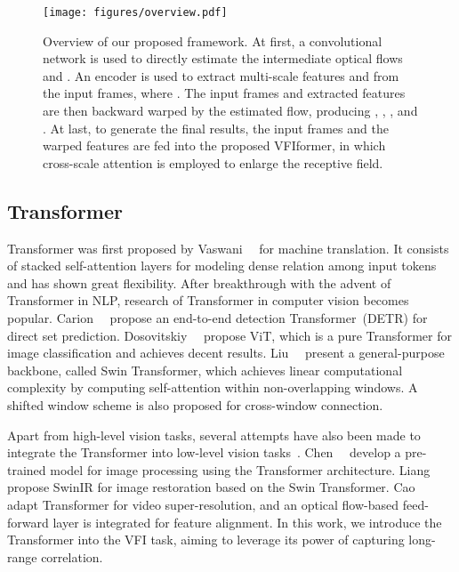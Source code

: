 \documentclass[10pt,twocolumn,letterpaper]{article}
\begin{document}
	\begin{figure*}[t]
		\begin{center}
			\texttt{[image: figures/overview.pdf]}
		\end{center}
\caption{Overview of our proposed framework. At first, a convolutional network is used to directly estimate the intermediate optical flows  and . An encoder  is used to extract multi-scale features  and  from the input frames, where . The input frames and extracted features are then backward warped by the estimated flow, producing , , , and . At last, to generate the final results, the input frames and the warped features are fed into the proposed VFIformer, in which cross-scale attention is employed to enlarge the receptive field.}
		\label{fig:overview}
	\end{figure*}
	
	
	\subsection{Transformer}
	
	Transformer was first proposed by Vaswani~\etal~\cite{vaswani2017attention} for machine translation. It consists of stacked self-attention layers for modeling dense relation among input tokens and has shown great flexibility. After breakthrough with the advent of Transformer in NLP, research of Transformer in computer vision becomes popular. Carion~\etal~\cite{carion2020end} propose an end-to-end detection Transformer~(DETR) for direct set prediction. Dosovitskiy~\etal~\cite{dosovitskiy2020image} propose ViT, which is a pure Transformer for image classification and achieves decent results. Liu~\etal~\cite{liu2021swin} present a general-purpose backbone, called Swin Transformer, which achieves linear computational complexity by computing self-attention within non-overlapping windows. A shifted window scheme is also proposed for cross-window connection. 
	
	Apart from high-level vision tasks, several attempts have also been made to integrate the Transformer into low-level vision tasks~\cite{ttsr,cao2021video,chen2021pre,liang2021swinir}. Chen~\etal~\cite{chen2021pre} develop a pre-trained model for image processing using the Transformer architecture. Liang~\etal~\cite{liang2021swinir} propose SwinIR for image restoration based on the Swin Transformer. Cao~\etal~\cite{cao2021video} adapt Transformer for video super-resolution, and an optical flow-based feed-forward layer is integrated for feature alignment. In this work, we introduce the Transformer into the VFI task, aiming to leverage its power of capturing long-range correlation.
	
\end{document}
